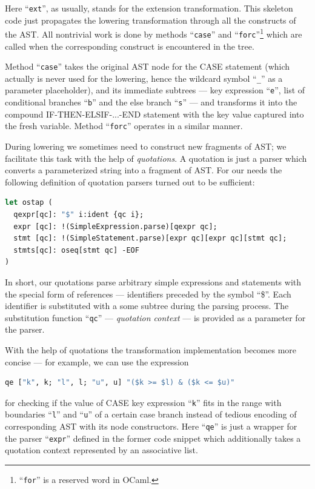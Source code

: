 Here ``\lstinline{ext}'', as usually, stands for the extension transformation. This skeleton
code just propagates the lowering transformation through all the constructs of the AST. All
nontrivial work is done by methods ``\lstinline{case}'' and 
``\lstinline{forc}''\footnote{``\lstinline{for}'' is a reserved word in OCaml.} which are 
called when the corresponding construct is encountered in the tree.

Method ``\lstinline{case}'' takes the original AST node for the CASE statement 
(which actually is never used for the lowering, hence the wildcard symbol ``\lstinline{_}'' 
as a parameter placeholder), and its immediate subtrees --- key expression ``\lstinline{e}'',
list of conditional branches ``\lstinline{b}'' and the else branch ``\lstinline{s}'' --- and transforms it 
into the compound \mbox{IF-THEN-ELSIF-...-END} statement with the key value captured into the fresh variable.
Method ``\lstinline{forc}'' operates in a similar manner.

During lowering we sometimes need to construct new fragments of AST; we facilitate this task
with the help of \emph{quotations}. A quotation is just a parser which converts a parameterized 
string into a fragment of AST. For our needs the following definition of quotation parsers turned out 
to be sufficient:

\begin{lstlisting}[language=ocaml]
let ostap (
  qexpr[qc]: "$" i:ident {qc i};
  expr [qc]: !(SimpleExpression.parse)[qexpr qc];
  stmt [qc]: !(SimpleStatement.parse)[expr qc][expr qc][stmt qc];
  stmts[qc]: oseq[stmt qc] -EOF
)
\end{lstlisting}

In short, our quotations parse arbitrary simple expressions and statements with the special form of
references --- identifiers preceded by the symbol ``\$''. Each identifier is substituted with a
some subtree during the parsing process. The substitution function ``\lstinline{qc}'' --- 
\emph{quotation context} --- is provided as a parameter for the parser. 

With the help of quotations the transformation implementation becomes more concise --- for example, 
we can use the expression

\begin{lstlisting}[language=ocaml]
   qe ["k", k; "l", l; "u", u] "($k >= $l) & ($k <= $u)"
\end{lstlisting}

for checking if the value of CASE key expression ``\lstinline{k}'' fits in the range with boundaries
``\lstinline{l}'' and ``\lstinline{u}'' of a certain case branch instead of tedious encoding of corresponding 
AST with its node constructors. Here ``\lstinline{qe}'' is just a wrapper for the parser ``\lstinline{expr}''
defined in the former code snippet which additionally takes a quotation context represented by an associative 
list.

